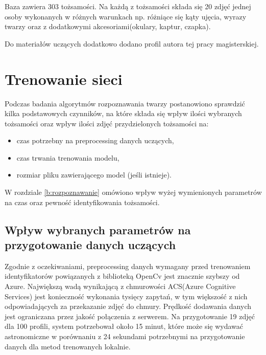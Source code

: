Baza zawiera 303 tożsamości. Na każdą z tożsamości składa się 20 zdjęć jednej osoby wykonanych w różnych warunkach np. różniące się kąty ujęcia, wyrazy twarzy oraz z dodatkowymi akcesoriami(okulary, kaptur, czapka). 

Do materiałów uczących dodatkowo dodano profil autora tej pracy magisterskiej.

\section{Trenowanie sieci}
Podczas badania algorytmów rozpoznawania twarzy postanowiono sprawdzić kilka podstawowych czynników, na które składa się wpływ ilości wybranych tożsamości oraz wpływ ilości zdjęć przydzielonych tożsamości na:
\begin{itemize}
\item czas potrzebny na preprocessing danych uczących,
\item czas trwania trenowania modelu,
\item rozmiar pliku zawierającego model (jeśli istnieje).
\end{itemize}
W rozdziale \ref{b:rozpoznawanie} omówiono wpływ wyżej wymienionych parametrów na czas oraz pewność identyfikowania tożsamości.

\subsection{Wpływ wybranych parametrów na przygotowanie danych uczących}
Zgodnie z oczekiwaniami, preprocessing danych wymagany przed trenowaniem identyfikatorów powiązanych z biblioteką OpenCv jest znacznie szybszy od Azure. Największą wadą wynikającą z chmurowości  ACS(Azure Cognitive Services) jest konieczność wykonania tysięcy zapytań, w tym większość z nich odpowiadających za przekazanie zdjęć do chmury. Prędkość dodawania danych jest ograniczana przez jakość połączenia z serwerem. Na przygotowanie 19 zdjęć dla 100 profili, system potrzebował około 15 minut, które może się wydawać astronomiczne w porównaniu z 24 sekundami potrzebnymi na przygotowanie danych dla metod trenowanych lokalnie.

